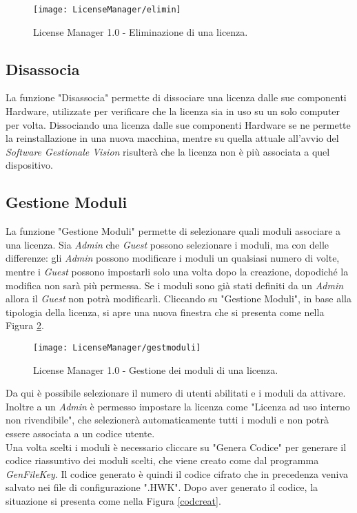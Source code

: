 \begin{figure}[!h] 
    \centering 
    \texttt{[image: LicenseManager/elimin]} 
    \caption{License Manager 1.0 - Eliminazione di una licenza.}
\label{elim}
\end{figure}

\subsection{Disassocia}

La funzione "Disassocia" permette di dissociare una licenza dalle sue componenti Hardware, utilizzate per verificare che la licenza sia in uso su un solo computer per volta. 
Dissociando una licenza dalle sue componenti Hardware se ne permette la reinstallazione in una nuova macchina, mentre su quella attuale all’avvio del \textit{Software Gestionale Vision} risulterà che la licenza non è più associata a quel dispositivo.

\subsection{Gestione Moduli}
\label{gestmod}
La funzione "Gestione Moduli" permette di selezionare quali moduli associare a una licenza. Sia \textit{Admin} che \textit{Guest} possono selezionare i moduli, ma con delle differenze: gli \textit{Admin} possono modificare i moduli un qualsiasi numero di volte, mentre i \textit{Guest} possono impostarli solo una volta dopo la creazione, dopodiché la modifica non sarà più permessa. Se i moduli sono già stati definiti da un \textit{Admin} allora il \textit{Guest} non potrà modificarli.
Cliccando su "Gestione Moduli", in base alla tipologia della licenza, si apre una nuova finestra che si presenta come nella Figura \ref{gest}.

\begin{figure}[!h] 
    \centering 
    \texttt{[image: LicenseManager/gestmoduli]} 
    \caption{License Manager 1.0 - Gestione dei moduli di una licenza.}
\label{gest}
\end{figure}

Da qui è possibile selezionare il numero di utenti abilitati e i moduli da attivare. Inoltre a un \textit{Admin} è permesso impostare la licenza come "Licenza ad uso interno non rivendibile", che selezionerà automaticamente tutti i moduli e non potrà essere associata a un codice utente.\\
Una volta scelti i moduli è necessario cliccare su "Genera Codice" per generare il codice riassuntivo dei moduli scelti, che viene creato come dal programma \textit{GenFileKey}. Il codice generato è quindi il codice cifrato che in precedenza veniva salvato nei file di configurazione ".HWK".  Dopo aver generato il codice, la situazione si presenta come nella Figura \ref{codcreat}.

